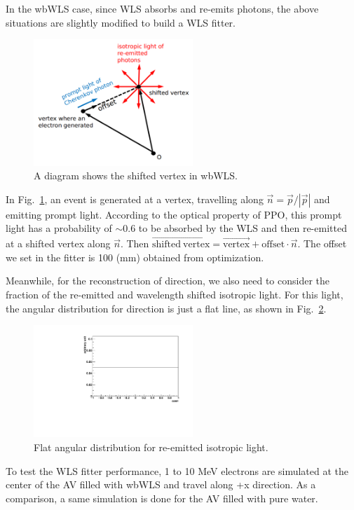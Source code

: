 \documentclass[preprint,12pt]{elsarticle}
\numberwithin{equation}{section}
\begin{document}
In the wbWLS case, since WLS absorbs and re-emits photons, the above situations are slightly modified to build a WLS fitter.

\begin{figure}[htbp]
	\centering	
	\includegraphics[width=6cm]{FitterDiagram.pdf}
	\caption{\label{FitterDiagram} 
		A diagram shows the shifted vertex in wbWLS.
	}
\end{figure}

In Fig.~\ref{FitterDiagram}, an event is generated at a vertex, travelling along $\vec n = \vec{p}/|\vec{p}|$ and emitting prompt light. According to the optical property of PPO, this prompt light has a probability of $\sim$0.6 to be absorbed by the WLS and then re-emitted at a shifted vertex along $\vec n$. Then $\overrightarrow{\mathrm{shifted~vertex}}=\overrightarrow{\mathrm{vertex}}+\mathrm{offset}\cdot\vec{n}$.  
The offset we set in the fitter is 100 (mm) obtained from optimization. 

Meanwhile, for the reconstruction of direction, we also need to consider the fraction of the re-emitted and wavelength shifted isotropic light. For this light, the angular distribution for direction is just a flat line, as shown in Fig.~\ref{WLSAngle}.

\begin{figure}[htbp]
	\centering
	\includegraphics[width=6cm]{WLSAngle_pdf.pdf}
	\caption{Flat angular distribution for re-emitted isotropic light.}
	\label{WLSAngle} 
\end{figure}

To test the WLS fitter performance, 1 to 10 MeV electrons are simulated at the center of the AV filled with wbWLS and travel along +x direction. As a comparison, a same simulation is done for the AV filled with pure water.
\end{document}
